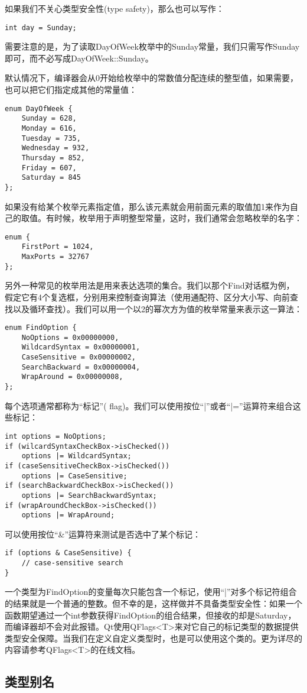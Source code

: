 \documentclass[11pt,oneside]{book}
\begin{document}
\begin{common-format}
如果我们不关心类型安全性(type safety)，那么也可以写作：
\begin{Verbatim}
int day = Sunday;
\end{Verbatim}

需要注意的是，为了读取DayOfWeek枚举中的Sunday常量，我们只需写作Sunday即可，而不必写成DayOfWeek::Sunday。

默认情况下，编译器会从0开始给枚举中的常数值分配连续的整型值，如果需要，也可以把它们指定成其他的常量值：
\begin{Verbatim}
enum DayOfWeek {
    Sunday = 628,
    Monday = 616,
    Tuesday = 735,
    Wednesday = 932,
    Thursday = 852,
    Friday = 607,
    Saturday = 845
};
\end{Verbatim}

如果没有给某个枚举元素指定值，那么该元素就会用前面元素的取值加1来作为自己的取值。有时候，枚举用于声明整型常量，这时，我们通常会忽略枚举的名字：
\begin{Verbatim}
enum {
    FirstPort = 1024,
    MaxPorts = 32767
};
\end{Verbatim}

另外一种常见的枚举用法是用来表达选项的集合。我们以那个Find对话框为例，假定它有4个复选框，分别用来控制查询算法（使用通配符、区分大小写、向前查找以及循环查找）。我们可以用一个以2的幂次方为值的枚举常量来表示这一算法：
\begin{Verbatim}
enum FindOption {
    NoOptions = 0x00000000,
    WildcardSyntax = 0x00000001,
    CaseSensitive = 0x00000002,
    SearchBackward = 0x00000004,
    WrapAround = 0x00000008,
};
\end{Verbatim}

每个选项通常都称为“标记”( flag)。我们可以使用按位“|”或者“|=”运算符来组合这些标记：
\begin{Verbatim}
int options = NoOptions;
if (wilcardSyntaxCheckBox->isChecked())
    options |= WildcardSyntax;
if (caseSensitiveCheckBox->isChecked())
    options |= CaseSensitive;
if (searchBackwardCheckBox->isChecked())
    options |= SearchBackwardSyntax;
if (wrapAroundCheckBox->isChecked())
    options |= WrapAround;
\end{Verbatim}

可以使用按位“\&{}”运算符来测试是否选中了某个标记：
\begin{Verbatim}
if (options & CaseSensitive) {
    // case-sensitive search
}
\end{Verbatim}

一个类型为FindOption的变量每次只能包含一个标记，使用“|”对多个标记符组合的结果就是一个普通的整数。但不幸的是，这样做并不具备类型安全性：如果一个函数期望通过一个int参数获得FindOption的组合结果，但接收的却是Saturday，而编译器却不会对此报错。Qt使用QFlags<T>来对它自己的标记类型的数据提供类型安全保障。当我们在定义自定义类型时，也是可以使用这个类的。更为详尽的内容请参考QFlags<T>的在线文档。



\subsection{类型别名}


\end{common-format}  
\end{document}
